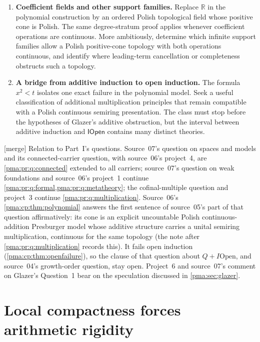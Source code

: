 \documentclass[11pt]{article}
\numberwithin{equation}{section}
\theoremstyle{definition}
\theoremstyle{remark}
\newcommand{\R}{\mathbb R}
\newcommand{\IOpen}{\mathsf{IOpen}}
\newcommand{\mergetag}{\textup{\textsf{\small[merge]}}}
\begin{document}
\begin{enumerate}[label=\textbf{\arabic*.},leftmargin=*,start=10]

\item \textbf{Coefficient fields and other support families.}
Replace $\R$ in the polynomial construction by an ordered
Polish topological field whose positive cone is Polish. The
same degree-stratum proof applies whenever coefficient
operations are continuous. More ambitiously, determine which
infinite support families allow a Polish positive-cone topology
with both operations continuous, and identify where leading-term
cancellation or completeness obstructs such a topology.

\item \textbf{A bridge from additive induction to open induction.}
The formula $x^2<t$ isolates one exact failure in the polynomial
model. Seek a useful classification of additional multiplication
principles that remain compatible with a Polish continuous
semiring presentation. The class must stop before the hypotheses
of Glazer's additive obstruction, but the interval between
additive induction and $\IOpen$ contains many distinct theories.

\end{enumerate}

\noindent\mergetag{} Relation to Part~I's questions. Source~07's question on
spaces and models and its connected-carrier question, with source~06's
project~4, are \cref{pma:pr:q:connected} extended to all carriers; source~07's
question on weak foundations and source~06's project~1 continue
\cref{pma:pr:q:formal,pma:pr:q:metatheory}; the cofinal-multiple question and
project~3 continue \cref{pma:pr:q:multiplication}. Source~06's
\cref{pma:cp:thm:polynomial} answers the first sentence of source~05's part
of that question affirmatively: its cone is an explicit uncountable Polish
continuous-addition Presburger model whose additive structure carries a
unital semiring multiplication, continuous for the same topology (the note
after \cref{pma:pr:q:multiplication} records this). It fails open induction
(\cref{pma:cp:thm:openfailure}), so the clause of that question about
$Q+I\mathrm{Open}$, and source~04's growth-order question, stay open. Project~6 and source~07's comment on Glazer's Question~1
bear on the speculation discussed in \cref{pma:sec:glazer}.

\part{Local compactness forces arithmetic rigidity}\label{pma:part:lc}
\end{document}
